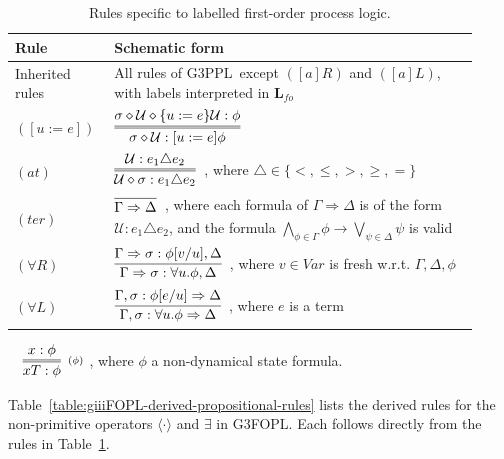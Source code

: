 \documentclass[manuscript,screen]{acmart}
\newcommand{\bff}[1]{\mathbf{#1}}
\newcommand{\mcl}[1]{\mathcal{#1}}
\newcommand{\la}[0]{\langle}
\newcommand{\ra}[0]{\rangle}
\newcommand{\Conf}[0]{\bff{L}}
\newcommand{\Var}[0]{\mathit{Var}}
\newcommand{\cat}[0]{\diamond}
\newcommand{\GiiiPPL}[0]{\mbox{G3PPL}}
\newcommand{\GiiiFOPL}[0]{\mbox{G3FOPL}}
\newcommand{\fo}[0]{{\textit{fo}}}
\newcommand{\upd}[0]{\mcl{U}}
\begin{document}
\begin{table}[t]
\centering
\small
\begin{tabular}{p{0.18\linewidth}p{0.74\linewidth}}
\toprule
Rule & Schematic form \\
\midrule
Inherited rules & All rules of \GiiiPPL\ except $([a]R)$ and $([a]L)$, with labels interpreted in $\Conf_\fo$\\[0.6em]
$([u:=e])$ & $\begin{aligned}\infer=[]{\sigma\cat\upd:[u:=e]\phi}{\sigma\cat\upd\cat\{u:=e\}\upd:\phi}\end{aligned}$\\[1.2em]
$(\textit{at})$ & $\begin{aligned}\infer=[]{\upd\cat\sigma:e_1\triangle e_2}{\upd:e_1\triangle e_2}\end{aligned}$, where $\triangle\in \{<, \le, >, \ge, =\}$\\[1.2em]
$(\textit{ter})$ & $\begin{aligned}\infer[]{\Gamma\Rightarrow\Delta}{}\end{aligned}$,  where each formula of $\Gamma\Rightarrow\Delta$ is of the form $\upd:e_1\triangle e_2$, and the formula $\bigwedge_{\phi\in \Gamma} \phi \to \bigvee_{\psi\in \Delta}\psi$ is valid \\[1.2em]
$(\forall R)$ & $\begin{aligned}\infer[]{\Gamma\Rightarrow\sigma : \forall u.\phi,\Delta}{\Gamma\Rightarrow\sigma : \phi[v/u],\Delta}\end{aligned}$, where $v\in\Var$ is fresh w.r.t. $\Gamma,\Delta,\phi$\\[1.2em]
$(\forall L)$ & $\begin{aligned}\infer[]{\Gamma,\sigma : \forall u.\phi\Rightarrow\Delta}{\Gamma,\sigma : \phi[e/u]\Rightarrow\Delta}\end{aligned}$, where $e$ is a term\\
\bottomrule
\end{tabular}
\caption{Rules specific to labelled first-order process logic.}
\label{table:giiifopl-rules}
\end{table}


\ifx
\ \ 
 $
  \begin{aligned}
 \infer=[^{(\phi)}]
 {xT : \phi}
 {x : \phi}
 \end{aligned}
$
, where $\phi$ a non-dynamical state formula. 
\\
\fi

Table~\ref{table:giiiFOPL-derived-propositional-rules} lists the derived rules for the non-primitive operators $\la\cdot\ra$ and $\exists$ in \GiiiFOPL. Each follows directly from the rules in Table~\ref{table:giiifopl-rules}. 
\end{document}
